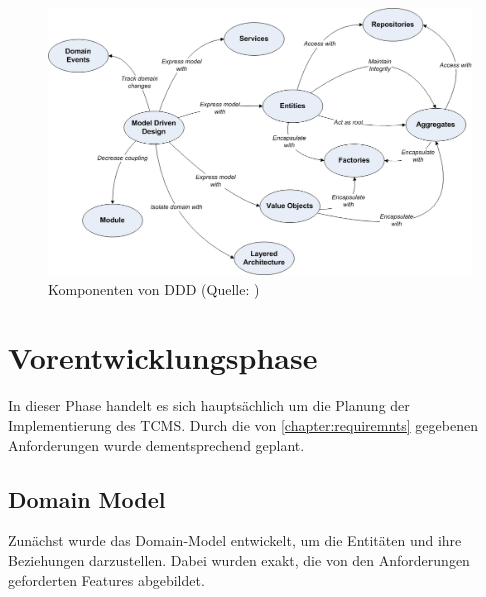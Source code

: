 \documentclass[a4paper, fontsize=11pt, parskip=half, twoside]{scrreprt}
\begin{document}
	\textcite{vernon_implementing_2013}
	
	\begin{figure}[H]
		\centering
		\includegraphics[scale=0.4]{assets/PatternsDDD.png}
		\caption{Komponenten von \ac{DDD} (Quelle: \textcite{noauthor_domain_nodate})}
	\end{figure}
	
	
	\section{Vorentwicklungsphase}
	In dieser Phase handelt es sich hauptsächlich um die Planung der Implementierung des \ac{TCMS}.
	Durch die von \autoref{chapter:requiremnts} gegebenen Anforderungen wurde dementsprechend geplant.
	
	\subsection{Domain Model}
	Zunächst wurde das Domain-Model entwickelt, um die Entitäten und ihre Beziehungen darzustellen.
	Dabei wurden exakt, die von den Anforderungen geforderten Features abgebildet.
	
\end{document}
